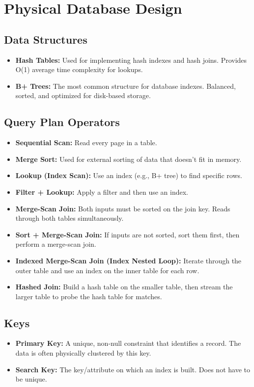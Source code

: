 
\section*{Physical Database Design}

\subsection*{Data Structures}
\begin{itemize}
    \item \textbf{Hash Tables:} Used for implementing hash indexes and hash joins. Provides O(1) average time complexity for lookups.
    \item \textbf{B+ Trees:} The most common structure for database indexes. Balanced, sorted, and optimized for disk-based storage.
\end{itemize}

\subsection*{Query Plan Operators}
\begin{itemize}
    \item \textbf{Sequential Scan:} Read every page in a table.
    \item \textbf{Merge Sort:} Used for external sorting of data that doesn't fit in memory.
    \item \textbf{Lookup (Index Scan):} Use an index (e.g., B+ tree) to find specific rows.
    \item \textbf{Filter + Lookup:} Apply a filter and then use an index.
    \item \textbf{Merge-Scan Join:} Both inputs must be sorted on the join key. Reads through both tables simultaneously.
    \item \textbf{Sort + Merge-Scan Join:} If inputs are not sorted, sort them first, then perform a merge-scan join.
    \item \textbf{Indexed Merge-Scan Join (Index Nested Loop):} Iterate through the outer table and use an index on the inner table for each row.
    \item \textbf{Hashed Join:} Build a hash table on the smaller table, then stream the larger table to probe the hash table for matches.
\end{itemize}

\subsection*{Keys}
\begin{itemize}
    \item \textbf{Primary Key:} A unique, non-null constraint that identifies a record. The data is often physically clustered by this key.
    \item \textbf{Search Key:} The key/attribute on which an index is built. Does not have to be unique.
\end{itemize}
